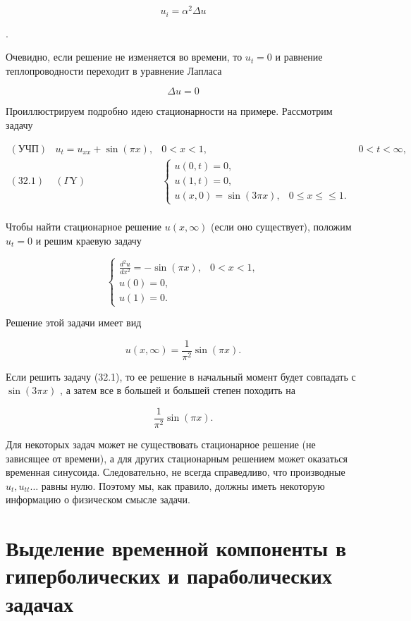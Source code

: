 \documentclass[
  ukrainian,
]{article}
\begin{document}
\[
u_i = \alpha^2 \Delta u
\]

.

Очевидно, если решение не изменяется во времени, то \(u_t = 0\) и
равнение теплопроводности переходит в уравнение Лапласа

\[
\Delta u = 0
\]

Проиллюстрируем подробно идею стационарности на примере. Рассмотрим
задачу

\[
\begin{array}{lll} (\text{УЧП}) & u_t = u_{xx} + \sin{(\pi x)}, & 0 < x < 1, & 0 < t < \infty, \\ (32.1) & (\Gamma \text{Y}) & \begin{cases} u(0, t) = 0, \\ u(1, t) = 0, \\ u(x, 0) = \sin{(3\pi x)}, & 0 \le x \le \le 1. \end{cases} \\ \end{array}
\]

Чтобы найти стационарное решение \(u\left(x,\infty\right)\) (если оно
существует), положим \(u_{t}\!=\!0\) и решим краевую задачу

\[
\begin{cases} \frac{d^{2}u}{dx^{2}} = -\sin(\pi x), & 0 < x < 1, \\ u(0) = 0, \\ u(1) = 0. \end{cases}
\]

Решение этой задачи имеет вид

\[
u(x, \infty) = \frac{1}{\pi^2} \sin{(\pi x)}.
\]

Если решить задачу (32.1), то ее решение в начальный момент будет
совпадать с \(\sin{(3\pi x)}\) , а затем все в большей и большей степен
походить на

\[
\frac{1}{\pi^2}\sin{(\pi x)}.
\]

Для некоторых задач может не существовать стационарное решение (не
зависящее от времени), а для других стационарным решением может
оказаться временная синусоида. Следовательно, не всегда справедливо, что
производные \(u_t, u_{tt} \dots\) равны нулю. Поэтому мы, как правило,
должны иметь некоторую информацию о физическом смысле задачи.

\section{Выделение временной компоненты в гиперболических и
параболических
задачах}\label{ux432ux44bux434ux435ux43bux435ux43dux438ux435-ux432ux440ux435ux43cux435ux43dux43dux43eux439-ux43aux43eux43cux43fux43eux43dux435ux43dux442ux44b-ux432-ux433ux438ux43fux435ux440ux431ux43eux43bux438ux447ux435ux441ux43aux438ux445-ux438-ux43fux430ux440ux430ux431ux43eux43bux438ux447ux435ux441ux43aux438ux445-ux437ux430ux434ux430ux447ux430ux445}
\end{document}
